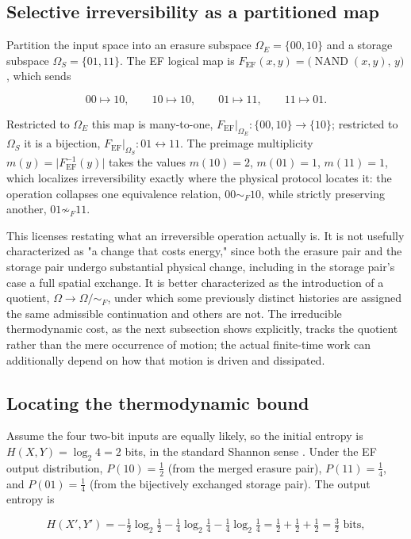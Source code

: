 \documentclass[11pt]{article}
\begin{document}
\subsection{Selective irreversibility as a partitioned map}

Partition the input space into an erasure subspace $\Omega_E=\{00,10\}$ and a storage subspace $\Omega_S=\{01,11\}$. The EF logical map is $F_{\mathrm{EF}}(x,y)=\bigl(\operatorname{NAND}(x,y),\,y\bigr)$, which sends

\[
00\mapsto10,\qquad 10\mapsto10,\qquad 01\mapsto11,\qquad 11\mapsto01.
\]

Restricted to $\Omega_E$ this map is many-to-one, $F_{\mathrm{EF}}\vert_{\Omega_E}:\{00,10\}\to\{10\}$; restricted to $\Omega_S$ it is a bijection, $F_{\mathrm{EF}}\vert_{\Omega_S}:01\leftrightarrow11$. The preimage multiplicity $m(y)=\bigl|F_{\mathrm{EF}}^{-1}(y)\bigr|$ takes the values $m(10)=2$, $m(01)=1$, $m(11)=1$, which localizes irreversibility exactly where the physical protocol locates it: the operation collapses one equivalence relation, $00\sim_F10$, while strictly preserving another, $01\not\sim_F11$.

This licenses restating what an irreversible operation actually is. It is not usefully characterized as "a change that costs energy," since both the erasure pair and the storage pair undergo substantial physical change, including in the storage pair's case a full spatial exchange. It is better characterized as the introduction of a quotient, $\Omega\to\Omega/{\sim_F}$, under which some previously distinct histories are assigned the same admissible continuation and others are not. The irreducible thermodynamic cost, as the next subsection shows explicitly, tracks the quotient rather than the mere occurrence of motion; the actual finite-time work can additionally depend on how that motion is driven and dissipated.

\subsection{Locating the thermodynamic bound}

Assume the four two-bit inputs are equally likely, so the initial entropy is $H(X,Y)=\log_2 4 = 2$ bits, in the standard Shannon sense \cite{CoverThomas2006}. Under the EF output distribution, $P(10)=\tfrac12$ (from the merged erasure pair), $P(11)=\tfrac14$, and $P(01)=\tfrac14$ (from the bijectively exchanged storage pair). The output entropy is

\[
H(X',Y') = -\tfrac12\log_2\tfrac12 - \tfrac14\log_2\tfrac14 - \tfrac14\log_2\tfrac14 = \tfrac12+\tfrac12+\tfrac12 = \tfrac32 \text{ bits},
\]
\end{document}
